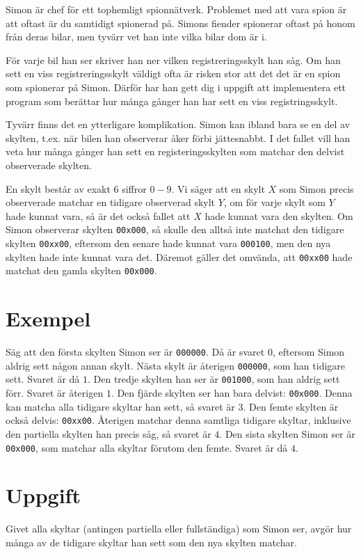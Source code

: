 \newcommand\version{v1}
Simon är chef för ett tophemligt spionnätverk.
Problemet med att vara spion är att oftast är du samtidigt spionerad på.
Simons fiender spionerar oftast på honom från deras bilar, men tyvärr vet han inte vilka bilar dom är i.

För varje bil han ser skriver han ner vilken registreringsskylt han såg.
Om han sett en viss registreringsskylt väldigt ofta är risken stor att det det är en spion som spionerar på Simon.
Därför har han gett dig i uppgift att implementera ett program som berättar hur många gånger han har sett en viss registringsskylt.

Tyvärr finns det en ytterligare komplikation.
Simon kan ibland bara se en del av skylten, t.ex. när bilen han observerar åker förbi jättesnabbt.
I det fallet vill han veta hur många gånger han sett en registeringsskylten som matchar den delvist observerade skylten.

En skylt består av exakt 6 siffror $0-9$.
Vi säger att en skylt $X$ som Simon precis observerade matchar en tidigare observerad skylt $Y$, om för varje
skylt som $Y$ hade kunnat vara, så är det också fallet att $X$ hade kunnat vara den skylten.
Om Simon observerar skylten \texttt{00x000}, så skulle den alltså inte matchat den tidigare skylten
\texttt{00xx00}, eftersom den senare hade kunnat vara \texttt{000100}, men den nya skylten hade inte kunnat vara det.
Däremot gäller det omvända, att \texttt{00xx00} hade matchat den gamla skylten \texttt{00x000}.

\section*{Exempel}
Säg att den första skylten Simon ser är \texttt{000000}. Då är svaret $0$, eftersom Simon aldrig sett någon annan skylt.
Nästa skylt är återigen \texttt{000000}, som han tidigare sett. Svaret är då $1$.
Den tredje skylten han ser är \texttt{001000}, som han aldrig sett förr. Svaret är återigen $1$.
Den fjärde skylten ser han bara delvist: \texttt{00x000}.
Denna kan matcha alla tidigare skyltar han sett, så svaret är $3$.
Den femte skylten är också delvis: \texttt{00xx00}. Återigen matchar denna samtliga tidigare skyltar,
inklusive den partiella skylten han precis såg, så svaret är $4$.
Den sista skylten Simon ser är \texttt{00x000}, som matchar alla skyltar förutom den femte. Svaret är då $4$.

\section*{Uppgift}
Givet alla skyltar (antingen partiella eller fullständiga) som Simon ser, avgör hur många av de tidigare
skyltar han sett som den nya skylten matchar.

